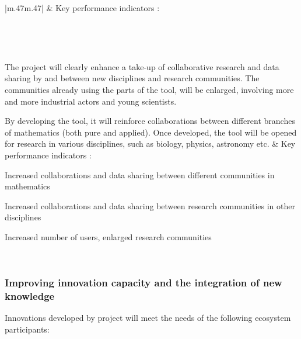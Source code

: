 \begin{supertabular}{|m{.47\textwidth}m{.47\textwidth}|}
 &
Key performance indicators :

\\\hline

\hline{}\\\hline

The project will clearly enhance a take-up
of collaborative research and data sharing by and between new
disciplines and research communities. The communities already using the
parts of the tool, will be enlarged, involving more and more industrial
actors and young scientists.

By developing the tool, it will reinforce collaborations between
different branches of mathematics (both pure and applied). Once
developed, the tool will be opened for research in various disciplines,
such as biology, physics, astronomy etc. &
Key performance indicators :

\begin{compactenum}
\item Increased collaborations and data sharing between different communities in
  mathematics
\item Increased collaborations and data sharing between research communities in other
  disciplines
\item Increased number of users, enlarged research communities
\end{compactenum}
\\\hline
\end{supertabular}

\subsubsection{Improving innovation capacity and the integration of new knowledge}


 Innovations developed by \TheProject project will meet the needs of the
following ecosystem participants:

